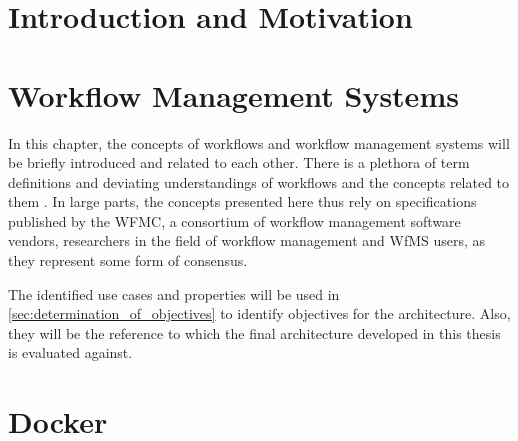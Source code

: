 \documentclass[language=english,noinputenc]{wiwwuwordrprt}
\begin{document}
  \newlength{\customtabwidth}
  \setlength{\customtabwidth}{\textwidth}
  \addtolength{\customtabwidth}{-\tabcolsep}

  \EinfTitelseite

  \tableofcontents
  \listoffigures
  \listoftables

  

  \clearpage
  


  \chapter{Introduction and Motivation} %
    \label{cha:introduction_and_motivation}
    

  \chapter{Workflow Management Systems} %
    \label{cha:workflow_management_systems}

    In this chapter, the concepts of workflows and workflow management systems will be briefly introduced and related to each other.
    There is a plethora of term definitions and deviating understandings of workflows and the concepts related to them \cite{Casati1999Specification}.
    In large parts, the concepts presented here thus rely on specifications published by the \ac{WFMC}, a consortium of workflow management software vendors, researchers in the field of workflow management and \ac{WfMS} users, as they represent some form of consensus.

    The identified use cases and properties will be used in \ref{sec:determination_of_objectives} to identify objectives for the architecture. Also, they will be the reference to which the final architecture developed in this thesis is evaluated against.

    

  \chapter{Docker} %
    \label{cha:docker}
\end{document}
